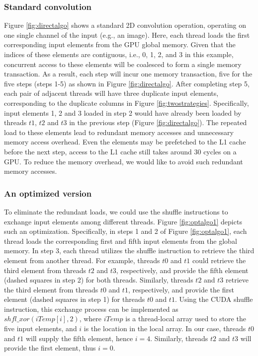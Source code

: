 
\subsubsection{Standard convolution} Figure \ref{fig:directalgo} shows a standard 2D convolution operation, operating on one single channel
of the input (e.g., an image). Here, each thread loads the first corresponding input elements from the GPU global memory. Given that the
indices of these elements are contiguous, i.e., 0, 1, 2, and 3 in this example, concurrent access to these elements will be coalesced to
form a single memory transaction. As a result, each step will incur one memory transaction, five for the five steps (steps 1-5) as shown in
Figure \ref{fig:directalgo}. After completing step 5, each pair of adjacent threads will have three duplicate input elements, corresponding
to the duplicate columns in Figure \ref{fig:twostrategies}. Specifically, input elements 1, 2 and 3 loaded in step 2 would have already
been loaded by threads $t1$, $t2$ and $t3$ in the previous step (Figure \ref{fig:directalgo}). The repeated load to these elements lead to
redundant memory accesses and unnecessary memory access overhead. Even the elements may be prefetched to the L1 cache before the next step,
access to the L1 cache still takes around 30 cycles on a GPU. To reduce the memory overhead, we would like to avoid such redundant memory
accesses.


\subsubsection{An optimized version} To eliminate the redundant loads, we could use the shuffle instructions to exchange input elements among
different threads.   Figure \ref{fig:optalgo1} depicts such an optimization. Specifically, in steps 1 and 2 of Figure \ref{fig:optalgo1},
each thread loads the corresponding first and fifth input elements from the global memory. In step 3, each thread utilizes the shuffle
instruction to retrieve the third element from another thread. For example, threads $t0$ and $t1$ could retrieve the third element from
threads $t2$ and $t3$, respectively, and provide the fifth element (dashed squares in step 2) for both threads. Similarly, threads $t2$ and
$t3$ retrieve the third element from threads $t0$ and $t1$, respectively, and provide the first element (dashed squares in step 1) for
threads $t0$ and $t1$. Using the CUDA shuffle instruction, this exchange process can be implemented as $shfl\_xor(iTemp[i],2)$, where
$iTemp$ is a thread-local array used to store the five input elements, and $i$ is the location in the local array. In our case, threads
$t0$ and $t1$ will supply the fifth element, hence $i=4$. Similarly, threads $t2$ and $t3$ will provide the first element, thus $i=0$.

